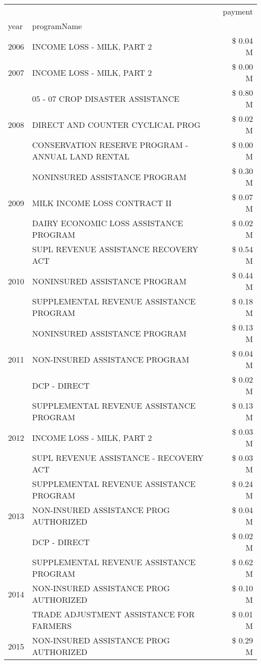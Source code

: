 \begin{tabular}{llr}
\toprule
 &  & payment \\
year & programName &  \\
\midrule
2006 & INCOME LOSS - MILK, PART 2 & \$ 0.04 M \\
\cline{1-3}
2007 & INCOME LOSS - MILK, PART 2 & \$ 0.00 M \\
\cline{1-3}
\multirow[t]{3}{*}{2008} & 05 - 07 CROP DISASTER ASSISTANCE & \$ 0.80 M \\
 & DIRECT AND COUNTER CYCLICAL PROG & \$ 0.02 M \\
 & CONSERVATION RESERVE PROGRAM - ANNUAL LAND RENTAL & \$ 0.00 M \\
\cline{1-3}
\multirow[t]{3}{*}{2009} & NONINSURED ASSISTANCE PROGRAM & \$ 0.30 M \\
 & MILK INCOME LOSS CONTRACT II & \$ 0.07 M \\
 & DAIRY ECONOMIC LOSS ASSISTANCE PROGRAM & \$ 0.02 M \\
\cline{1-3}
\multirow[t]{3}{*}{2010} & SUPL REVENUE ASSISTANCE RECOVERY ACT & \$ 0.54 M \\
 & NONINSURED ASSISTANCE PROGRAM & \$ 0.44 M \\
 & SUPPLEMENTAL REVENUE ASSISTANCE PROGRAM & \$ 0.18 M \\
\cline{1-3}
\multirow[t]{3}{*}{2011} & NONINSURED ASSISTANCE PROGRAM & \$ 0.13 M \\
 & NON-INSURED ASSISTANCE PROGRAM & \$ 0.04 M \\
 & DCP - DIRECT & \$ 0.02 M \\
\cline{1-3}
\multirow[t]{3}{*}{2012} & SUPPLEMENTAL REVENUE ASSISTANCE PROGRAM & \$ 0.13 M \\
 & INCOME LOSS - MILK, PART 2 & \$ 0.03 M \\
 & SUPL REVENUE ASSISTANCE - RECOVERY ACT & \$ 0.03 M \\
\cline{1-3}
\multirow[t]{3}{*}{2013} & SUPPLEMENTAL REVENUE ASSISTANCE PROGRAM & \$ 0.24 M \\
 & NON-INSURED ASSISTANCE PROG AUTHORIZED & \$ 0.04 M \\
 & DCP - DIRECT & \$ 0.02 M \\
\cline{1-3}
\multirow[t]{3}{*}{2014} & SUPPLEMENTAL REVENUE ASSISTANCE PROGRAM & \$ 0.62 M \\
 & NON-INSURED ASSISTANCE PROG AUTHORIZED & \$ 0.10 M \\
 & TRADE ADJUSTMENT ASSISTANCE FOR FARMERS & \$ 0.01 M \\
\cline{1-3}
\multirow[t]{3}{*}{2015} & NON-INSURED ASSISTANCE PROG AUTHORIZED & \$ 0.29 M \\

\end{tabular}
